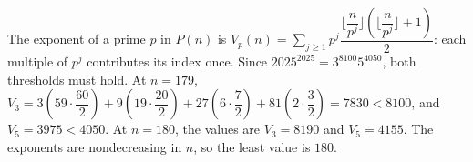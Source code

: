 The exponent of a prime $p$ in $P(n)$ is $V_p (n) = \sum_{j\ge1} p^j \dfrac{\lfloor \dfrac{n}{p^j} \rfloor (\lfloor \dfrac{n}{p^j} \rfloor + 1)}{2}$: each multiple of $p^j$ contributes its index once. Since $2025^{2025}=3^{8100}5^{4050}$, both thresholds must hold. At $n=179$, $V_3 = 3 (59 \cdot \dfrac{60}{2}) + 9 (19 \cdot \dfrac{20}{2}) + 27 (6 \cdot \dfrac{7}{2}) + 81 (2 \cdot \dfrac{3}{2}) = 7830 < 8100$, and $V_5=3975<4050$. At $n=180$, the values are $V_3=8190$ and $V_5=4155$. The exponents are nondecreasing in $n$, so the least value is $\boxed{180}$.
